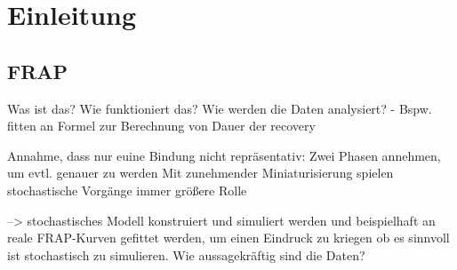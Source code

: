 \chapter{Einleitung}
\section{FRAP}
Was ist das?
Wie funktioniert das?
Wie werden die Daten analysiert? - Bspw. fitten an Formel zur Berechnung von Dauer der recovery

Annahme, dass nur euine Bindung nicht repräsentativ: Zwei Phasen annehmen, um evtl. genauer zu werden
Mit zunehmender Miniaturisierung spielen stochastische Vorgänge immer größere Rolle

--> stochastisches Modell konstruiert und simuliert werden und beispielhaft an reale FRAP-Kurven gefittet werden, um einen Eindruck zu kriegen ob es sinnvoll ist stochastisch zu simulieren. Wie aussagekräftig sind die Daten?